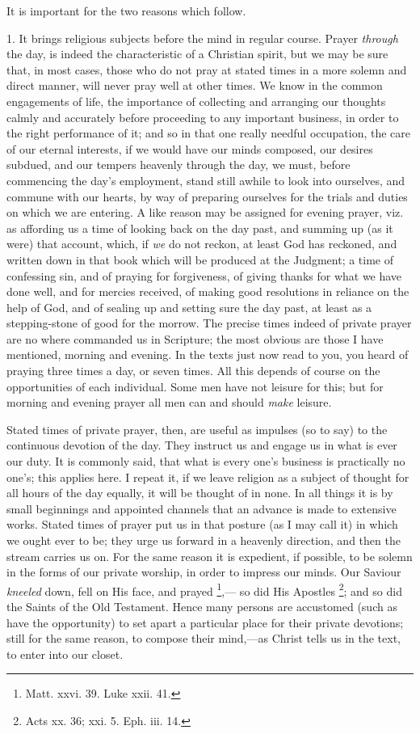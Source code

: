 It is important for the two reasons which follow.

1. It brings religious subjects before the mind in
regular course. Prayer \emph{through} the day, is indeed
the characteristic of a Christian spirit, but we may be
sure that, in most cases, those who do not pray at stated
times in a more solemn and direct manner, will never pray
well at other times. We know in the common engagements of
life, the importance of collecting and arranging our
thoughts calmly and accurately before proceeding to any
important business, in order to the right performance of
it; and so in that one really needful occupation, the
care of our eternal interests, if we would have our minds
composed, our desires subdued, and our tempers heavenly
through the day, we must, before commencing the day's
employment, stand still awhile to look into ourselves,
and commune with our hearts, by way of preparing
ourselves for the trials and duties on which we are
entering. A like reason may be assigned for evening
prayer, viz. as affording us a time of looking back on
the day past, and summing up (as it were) that account,
which, if \emph{we} do not reckon, at least God has
reckoned, and written down in that book which will be produced at the Judgment; a time of confessing sin, and
of praying for forgiveness, of giving thanks for what we
have done well, and for mercies received, of making good
resolutions in reliance on the help of God, and of
sealing up and setting sure the day past, at least as a
stepping-stone of good for the morrow. The precise times
indeed of private prayer are no where commanded us in
Scripture; the most obvious are those I have mentioned,
morning and evening. In the texts just now read to you,
you heard of praying three times a day, or seven times.
All this depends of course on the opportunities of each
individual. Some men have not leisure for this; but for
morning and evening prayer all men can and should \emph{make}
leisure.

Stated times of private prayer, then, are useful as
impulses (so to say) to the continuous devotion of the
day. They instruct us and engage us in what is ever our
duty. It is commonly said, that what is every one's
business is practically no one's; this applies here. I
repeat it, if we leave religion as a subject of thought
for all hours of the day equally, it will be thought of
in none. In all things it is by small beginnings and
appointed channels that an advance is made to extensive
works. Stated times of prayer put us in that posture (as
I may call it) in which we ought ever to be; they urge us
forward in a heavenly direction, and then the stream
carries us on. For the same reason it is expedient, if
possible, to be solemn in the forms of our private
worship, in order to impress our minds. Our Saviour \emph{kneeled}
down, fell on His face, and prayed \footnote{Matt. xxvi. 39. Luke xxii. 41.},— so did His Apostles \footnote{Acts xx. 36; xxi.
5. Eph. iii. 14.}; and so did the Saints of the Old
Testament. Hence many persons are accustomed (such as
have the opportunity) to set apart a particular place for
their private devotions; still for the same reason, to
compose their mind,—as Christ tells us in the text,
to enter into our closet.

